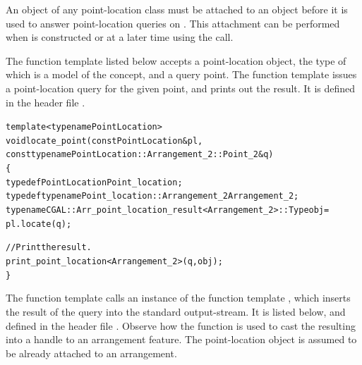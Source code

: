 An object  of any point-location class must be attached to an
 object  before it is used to answer
point-location queries on . This attachment can be performed
when  is constructed or at a later time using the
 call.

The function template listed below accepts a point-location object,
the type of which is a model of the 
concept, and a query point. The function template issues a
point-location query for the given point, and prints out the result.
It is defined in the header file .

\label{lst:pl}
\begin{alltt}
template <typename PointLocation>
void locate_point(const PointLocation& pl,
                  const typename PointLocation::Arrangement_2::Point_2& q)
\{
  typedef PointLocation                                 Point_location;
  typedef typename Point_location::Arrangement_2        Arrangement_2;
  typename CGAL::Arr_point_location_result<Arrangement_2>::Type obj =
    pl.locate(q);

  // Print the result.
  print_point_location<Arrangement_2>(q, obj);
\}
\end{alltt}

The function template  calls an instance of the
function template , which inserts the
result of the query into the standard output-stream. It is listed
below, and defined in the header file .
Observe how the function  is used to cast the
resulting  into a handle to an arrangement feature.
The point-location object  is assumed to be already attached
to an arrangement.

